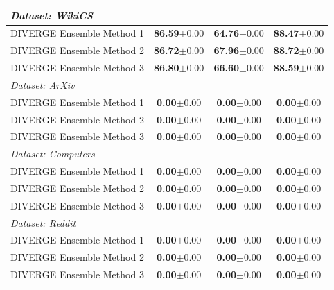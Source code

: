 \documentclass[a4paper,fleqn]{cas-sc}
\begin{document}
\begin{table}[htbp]
\begin{tabular*}{\textwidth}{@{\extracolsep{\fill}} lccc @{}}
\midrule
\multicolumn{4}{l}{\textit{Dataset: WikiCS}} \\
\midrule
DIVERGE Ensemble Method 1 & \textbf{86.59}{\scriptsize$\pm$0.00} & \textbf{64.76}{\scriptsize$\pm$0.00} & \textbf{88.47}{\scriptsize$\pm$0.00} \\
DIVERGE Ensemble Method 2 & \textbf{86.72}{\scriptsize$\pm$0.00} & \textbf{67.96}{\scriptsize$\pm$0.00} & \textbf{88.72}{\scriptsize$\pm$0.00} \\
DIVERGE Ensemble Method 3 & \textbf{86.80}{\scriptsize$\pm$0.00} & \textbf{66.60}{\scriptsize$\pm$0.00} & \textbf{88.59}{\scriptsize$\pm$0.00} \\
\midrule
\multicolumn{4}{l}{\textit{Dataset: ArXiv}} \\
\midrule
DIVERGE Ensemble Method 1 & \textbf{0.00}{\scriptsize$\pm$0.00} & \textbf{0.00}{\scriptsize$\pm$0.00} & \textbf{0.00}{\scriptsize$\pm$0.00} \\
DIVERGE Ensemble Method 2 & \textbf{0.00}{\scriptsize$\pm$0.00} & \textbf{0.00}{\scriptsize$\pm$0.00} & \textbf{0.00}{\scriptsize$\pm$0.00} \\
DIVERGE Ensemble Method 3 & \textbf{0.00}{\scriptsize$\pm$0.00} & \textbf{0.00}{\scriptsize$\pm$0.00} & \textbf{0.00}{\scriptsize$\pm$0.00} \\
\midrule
\multicolumn{4}{l}{\textit{Dataset: Computers}} \\
\midrule
DIVERGE Ensemble Method 1 & \textbf{0.00}{\scriptsize$\pm$0.00} & \textbf{0.00}{\scriptsize$\pm$0.00} & \textbf{0.00}{\scriptsize$\pm$0.00} \\
DIVERGE Ensemble Method 2 & \textbf{0.00}{\scriptsize$\pm$0.00} & \textbf{0.00}{\scriptsize$\pm$0.00} & \textbf{0.00}{\scriptsize$\pm$0.00} \\
DIVERGE Ensemble Method 3 & \textbf{0.00}{\scriptsize$\pm$0.00} & \textbf{0.00}{\scriptsize$\pm$0.00} & \textbf{0.00}{\scriptsize$\pm$0.00} \\
\midrule
\multicolumn{4}{l}{\textit{Dataset: Reddit}} \\
\midrule
DIVERGE Ensemble Method 1 & \textbf{0.00}{\scriptsize$\pm$0.00} & \textbf{0.00}{\scriptsize$\pm$0.00} & \textbf{0.00}{\scriptsize$\pm$0.00} \\
DIVERGE Ensemble Method 2 & \textbf{0.00}{\scriptsize$\pm$0.00} & \textbf{0.00}{\scriptsize$\pm$0.00} & \textbf{0.00}{\scriptsize$\pm$0.00} \\
DIVERGE Ensemble Method 3 & \textbf{0.00}{\scriptsize$\pm$0.00} & \textbf{0.00}{\scriptsize$\pm$0.00} & \textbf{0.00}{\scriptsize$\pm$0.00} \\
\bottomrule
\end{tabular*}
\end{table}
\end{document}
